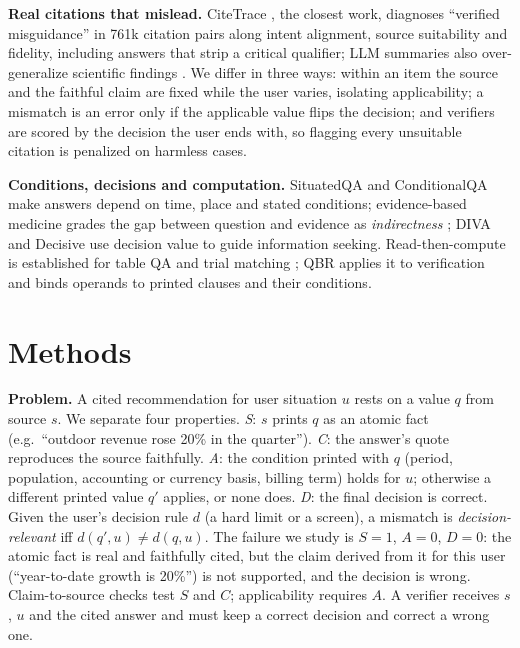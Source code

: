 \documentclass[11pt,letterpaper]{article}
\begin{document}
\textbf{Real citations that mislead.} CiteTrace \citep{verified_misguidance}, the closest work, diagnoses ``verified misguidance'' in 761k citation pairs along intent alignment, source suitability and fidelity, including answers that strip a critical qualifier; LLM summaries also over-generalize scientific findings \citep{generalization_bias}. We differ in three ways: within an item the source and the faithful claim are fixed while the user varies, isolating applicability; a mismatch is an error only if the applicable value flips the decision; and verifiers are scored by the decision the user ends with, so flagging every unsuitable citation is penalized on harmless cases.

\textbf{Conditions, decisions and computation.} SituatedQA \citep{situatedqa} and ConditionalQA \citep{conditionalqa} make answers depend on time, place and stated conditions; evidence-based medicine grades the gap between question and evidence as \emph{indirectness} \citep{grade_indirectness}; DIVA \citep{diva} and Decisive \citep{decisive} use decision value to guide information seeking. Read-then-compute is established for table QA \citep{tagop} and trial matching \citep{verdict}; QBR applies it to verification and binds operands to printed clauses and their conditions.

\section{Methods}
\label{sec:methods}
\textbf{Problem.} A cited recommendation for user situation $u$ rests on a value $q$ from source $s$. We separate four properties. \emph{S}: $s$ prints $q$ as an atomic fact (e.g.\ ``outdoor revenue rose 20\% in the quarter''). \emph{C}: the answer's quote reproduces the source faithfully. \emph{A}: the condition printed with $q$ (period, population, accounting or currency basis, billing term) holds for $u$; otherwise a different printed value $q'$ applies, or none does. \emph{D}: the final decision is correct. Given the user's decision rule $d$ (a hard limit or a screen), a mismatch is \emph{decision-relevant} iff $d(q',u)\neq d(q,u)$. The failure we study is $S=1$, $A=0$, $D=0$: the atomic fact is real and faithfully cited, but the claim derived from it for this user (``year-to-date growth is 20\%'') is not supported, and the decision is wrong. Claim-to-source checks test $S$ and $C$; applicability requires $A$. A verifier receives $s$, $u$ and the cited answer and must keep a correct decision and correct a wrong one.
\end{document}
